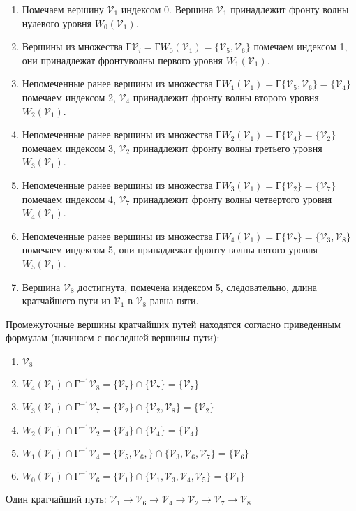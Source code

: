 \begin{enumerate}
\item Помечаем вершину $\mathcal{V}_1$ индексом 0. Вершина $\mathcal{V}_1$ принадлежит фронту волны нулевого уровня $W_0(\mathcal{V}_1)$.

\item Вершины из множества $\text{Г}\mathcal{V}_i = \text{Г}W_0(\mathcal{V}_1) = \{\mathcal{V}_5 , \mathcal{V}_6 \} $  помечаем индексом 1, они принадлежат фронтуволны первого уровня $W_1(\mathcal{V}_1)$.

\item Непомеченные ранее вершины из множества $\text{Г}W_1(\mathcal{V}_1) = \text{Г}\{\mathcal{V}_ 5, \mathcal{V}_6\} = \{\mathcal{V}_4 \}$ помечаем индексом 2, $\mathcal{V}_4$ принадлежит фронту волны второго уровня $W_2(\mathcal{V}_1)$.

\item Непомеченные ранее вершины из множества $\text{Г}W_2(\mathcal{V}_1) = \text{Г}\{\mathcal{V}_4 \} = \{\mathcal{V}_2 \}$  помечаем индексом 3, $\mathcal{V}_2$ принадлежит фронту волны третьего уровня $W_3(\mathcal{V}_1)$.

\item Непомеченные ранее вершины из множества $\text{Г}W_3(\mathcal{V}_1) = \text{Г}\{\mathcal{V}_2 \} = \{\mathcal{V}_7 \}$  помечаем индексом 4, $\mathcal{V}_7$ принадлежит фронту волны четвертого уровня $W_4(\mathcal{V}_1)$.

\item Непомеченные ранее вершины из множества $\text{Г}W_4(\mathcal{V}_1) = \text{Г}\{\mathcal{V}_7 \} = \{\mathcal{V}_3,\mathcal{V}_8\}$  помечаем индексом 5, они принадлежат фронту волны пятого уровня $W_5(\mathcal{V}_1)$.

\item Вершина $\mathcal{V}_8$ достигнута, помечена индексом 5, следовательно, длина кратчайшего пути из $\mathcal{V}_1$  в $\mathcal{V}_8$  равна пяти.

\end{enumerate}

Промежуточные вершины кратчайших путей находятся согласно приведенным формулам (начинаем с последней вершины пути):


\begin{enumerate}
\item $\mathcal{V}_8$
\item $W_4(\mathcal{V}_1)\cap\text{Г}^{-1}\mathcal{V}_8=\{\mathcal{V}_7\}\cap\{\mathcal{V}_7\}=\{\mathcal{V}_7\}$
\item $W_3(\mathcal{V}_1)\cap\text{Г}^{-1}\mathcal{V}_7=\{\mathcal{V}_2\}\cap\{\mathcal{V}_2,\mathcal{V}_8\}=\{\mathcal{V}_2\}$
\item $W_2(\mathcal{V}_1)\cap\text{Г}^{-1}\mathcal{V}_2=\{\mathcal{V}_4\}\cap\{\mathcal{V}_4\}=\{\mathcal{V}_4\}$
\item $W_1(\mathcal{V}_1)\cap\text{Г}^{-1}\mathcal{V}_4=\{\mathcal{V}_5,\mathcal{V}_6,\}\cap\{\mathcal{V}_3,\mathcal{V}_6,\mathcal{V}_7\}=\{\mathcal{V}_6\}$
\item $W_0(\mathcal{V}_1)\cap\text{Г}^{-1}\mathcal{V}_6=\{\mathcal{V}_1\}\cap\{\mathcal{V}_1,\mathcal{V}_3,\mathcal{V}_4,\mathcal{V}_5\}=\{\mathcal{V}_1\}$
\end{enumerate}

Один кратчайший путь: $\mathcal{V}_1\rightarrow\mathcal{V}_6\rightarrow\mathcal{V}_4\rightarrow\mathcal{V}_2\rightarrow\mathcal{V}_7\rightarrow\mathcal{V}_8$

\newpage
